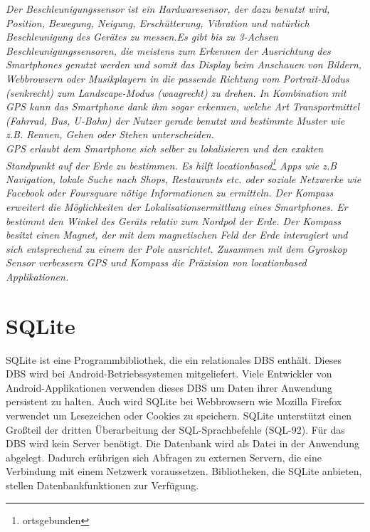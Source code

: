  \textit{Der Beschleunigungssensor ist ein Hardwaresensor, der dazu benutzt wird, Position, Bewegung, Neigung, Erschütterung, Vibration und natürlich Beschleunigung des Gerätes zu messen.Es gibt bis zu 3-Achsen Beschleunigungssensoren, die meistens zum Erkennen der Ausrichtung des \glspl{Smartphone} genutzt werden und somit das Display beim Anschauen von Bildern, Webbrowsern oder Musikplayern in die passende Richtung vom Portrait-Modus (senkrecht) zum Landscape-Modus (waagrecht) zu drehen. In Kombination mit \gls{GPS} kann das \gls{Smartphone} dank ihm sogar erkennen, welche Art Transportmittel (Fahrrad, Bus, U-Bahn) der Nutzer gerade benutzt und bestimmte Muster wie z.B. Rennen, Gehen oder Stehen unterscheiden.\\
\gls{GPS} erlaubt dem \gls{Smartphone} sich selber zu lokalisieren und den exakten Standpunkt auf der Erde zu bestimmen. Es hilft locationbased\footnote{ ortsgebunden} \Glspl{App} wie z.B Navigation, lokale Suche nach Shops, Restaurants etc. oder soziale Netzwerke wie Facebook oder Foursquare nötige Informationen zu ermitteln. Der Kompass erweitert die Möglichkeiten der Lokalisationsermittlung eines \gls{Smartphone}s. Er bestimmt den Winkel des Geräts relativ zum Nordpol der Erde. Der Kompass besitzt einen Magnet, der mit dem magnetischen Feld der Erde interagiert und sich entsprechend zu einem der Pole ausrichtet. Zusammen mit dem Gyroskop Sensor verbessern \gls{GPS} und Kompass die Präzision von locationbased Applikationen.}

\section{SQLite}
SQLite ist eine Programmbibliothek, die ein relationales DBS enthält.
Dieses DBS wird bei Android-Betriebssystemen mitgeliefert. Viele
Entwickler von Android-Applikationen verwenden dieses DBS um
Daten ihrer Anwendung persistent zu halten. Auch wird SQLite bei
Webbrowsern wie Mozilla Firefox verwendet um Lesezeichen oder
Cookies zu speichern. SQLite unterstützt einen Großteil der dritten
Überarbeitung der SQL-Sprachbefehle (SQL-92). Für das DBS wird
kein Server benötigt. Die Datenbank wird als Datei in der Anwendung
abgelegt. Dadurch erübrigen sich Abfragen zu externen Servern, die
eine Verbindung mit einem Netzwerk voraussetzen. Bibliotheken, die
SQLite anbieten, stellen Datenbankfunktionen zur Verfügung.


